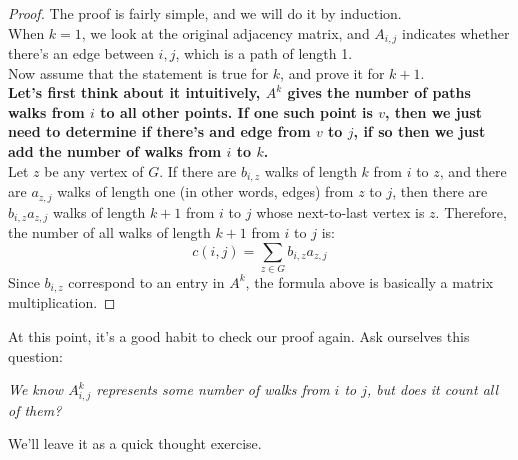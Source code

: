 \documentclass[12pt]{article}
\begin{document}
\begin{proof}
	The proof is fairly simple, and we will do it by induction.\\
	\newline
	When $k = 1$, we look at the original adjacency matrix, and $A_{i, j}$ indicates whether there's an edge between $i, j$, which is a path of length 1.\\
	\newline
	Now assume that the statement is true for $k$, and
	prove it for $k + 1$. \\
	\newline
	\textbf{Let's first think about it intuitively, $A^{k}$ gives the number of paths walks from $i$ to all other points. 
		If one such point is $v$, then we just need to determine if there's and edge from $v$ to $j$, 
		if so then we just add the number of walks from $i$ to  $k$.}\\
	\newline
	Let $z$ be any vertex of $G$. If there are $b_{i,z}$ walks of length $k$ from $i$ to $z$, and there are $a_{z,j}$ walks of length one (in other words, edges)
	from $z$ to $j$, then there are $b_{i,z}a_{z,j}$ walks of length $k + 1$ from $i$ to $j$ whose
	next-to-last vertex is $z$. Therefore, the number of all walks of length $k + 1$ from $i$ to $j$ is:
	$$
	c(i,j) = \sum_{z \in G} b_{i,z}a_{z,j}
	$$
	Since $b_{i, z}$ correspond to an entry in $A^k$, the formula above is basically a matrix multiplication. 
\end{proof}

At this point, it's a good habit to check our proof again. Ask ourselves this question:
\begin{center}
	\textit{We know $A^{k}_{i, j}$ represents some number of walks from $i$ to $j$, but does it count all of them?}
\end{center}
We'll leave it as a quick thought exercise.
\end{document}
